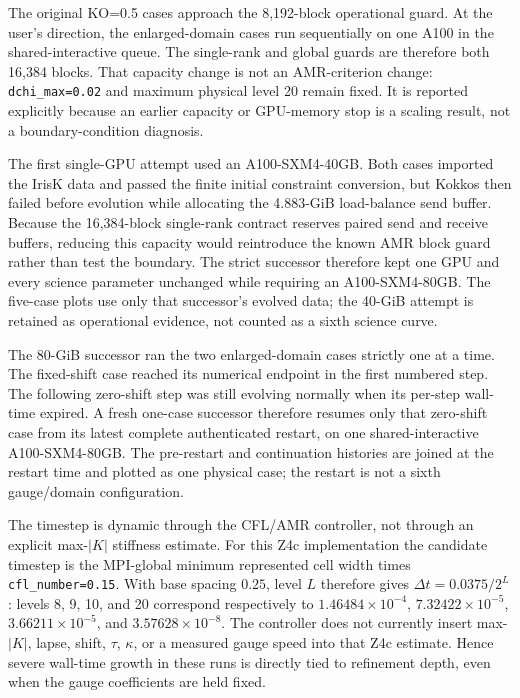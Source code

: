 \documentclass[11pt]{article}
\begin{document}
The original KO=0.5 cases approach the 8,192-block operational guard.  At the
user's direction, the enlarged-domain cases run sequentially on one A100 in
the shared-interactive queue.  The single-rank and global guards are therefore
both 16,384 blocks.  That capacity change is not an AMR-criterion change:
\texttt{dchi\_max=0.02} and maximum physical level 20 remain fixed.  It is
reported explicitly because an earlier capacity or GPU-memory stop is a
scaling result, not a boundary-condition diagnosis.

The first single-GPU attempt used an A100-SXM4-40GB.  Both cases imported the
IrisK data and passed the finite initial constraint conversion, but Kokkos then
failed before evolution while allocating the 4.883-GiB load-balance send
buffer.  Because the 16,384-block single-rank contract reserves paired send
and receive buffers, reducing this capacity would reintroduce the known AMR
block guard rather than test the boundary.  The strict successor therefore
kept one GPU and every science parameter unchanged while requiring an
A100-SXM4-80GB.  The five-case plots use only that successor's evolved data;
the 40-GiB attempt is retained as operational evidence, not counted as a sixth
science curve.

The 80-GiB successor ran the two enlarged-domain cases strictly one at a time.
The fixed-shift case reached its numerical endpoint in the first numbered
step.  The following zero-shift step was still evolving normally when its
per-step wall-time expired.  A fresh one-case successor therefore resumes
only that zero-shift case from its latest complete authenticated restart, on
one shared-interactive A100-SXM4-80GB.  The pre-restart and continuation
histories are joined at the restart time and plotted as one physical case;
the restart is not a sixth gauge/domain configuration.

The timestep is dynamic through the CFL/AMR controller, not through an
explicit max-$|K|$ stiffness estimate.  For this Z4c implementation the
candidate timestep is the MPI-global minimum represented cell width times
\texttt{cfl\_number=0.15}.  With base spacing $0.25$, level $L$ therefore gives
$\Delta t=0.0375/2^L$: levels 8, 9, 10, and 20 correspond respectively to
$1.46484\times10^{-4}$, $7.32422\times10^{-5}$,
$3.66211\times10^{-5}$, and $3.57628\times10^{-8}$.  The controller does not
currently insert max-$|K|$, lapse, shift, $\tau$, $\kappa$, or a measured gauge
speed into that Z4c estimate.  Hence severe wall-time growth in these runs is
directly tied to refinement depth, even when the gauge coefficients are held
fixed.
\end{document}
